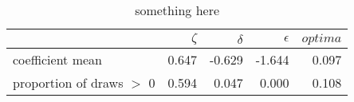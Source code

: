 \begin{table}[ht]
\centering
\begin{tabular}{lrrrr}
  \hline
  & $\zeta$ & $\delta$ & $\epsilon$ & $optima$ \\ 
  \hline
coefficient mean & 0.647 & -0.629 & -1.644 & 0.097 \\ 
  proportion of draws $>$ 0 & 0.594 & 0.047 & 0.000 & 0.108 \\ 
   \hline
\end{tabular}
\caption{something here} 
\end{table}
